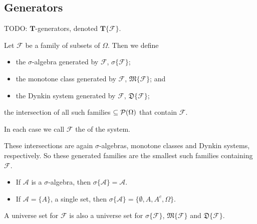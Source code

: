 \subsection{Generators}
TODO: $\boldsymbol{T}$-generators, denoted $\boldsymbol{T}\{\mathcal{F}\}$.
\begin{definition}
Let $\mathcal{F}$ be a family of subsets of $\Omega$. Then we define
\begin{itemize}
\item the $\sigma$-algebra generated by $\mathcal{F}$, $\sigma\{\mathcal{F}\}$;
\item the monotone class generated by $\mathcal{F}$, $\mathfrak{M}\{\mathcal{F}\}$; and
\item the Dynkin system generated by $\mathcal{F}$, $\mathfrak{D}\{\mathcal{F}\}$;
\end{itemize}
the intersection of all such families $\subseteq \operatorname{\mathcal{P}}(\Omega)$ that contain $\mathcal{F}$.

In each case we call $\mathcal{F}$ the  of the system.
\end{definition}
These intersections are again $\sigma$-algebras, monotone classes and Dynkin systems, respectively. So these generated families are the smallest such families containing $\mathcal{F}$.

\begin{example}
\begin{itemize}
\item If $\mathcal{A}$ is a $\sigma$-algebra, then $\sigma\{\mathcal{A}\} = \mathcal{A}$.
\item If $\mathcal{A} = \{A\}$, a single set, then $\sigma\{\mathcal{A}\} = \{\emptyset, A,A^c,\Omega\}$.
\end{itemize}
\end{example}

\begin{lemma} \label{unitGeneratedSets}
A universe set for $\mathcal{F}$ is also a universe set for $\sigma\{\mathcal{F}\}$, $\mathfrak{M}\{\mathcal{F}\}$ and $\mathfrak{D}\{\mathcal{F}\}$.
\end{lemma}

